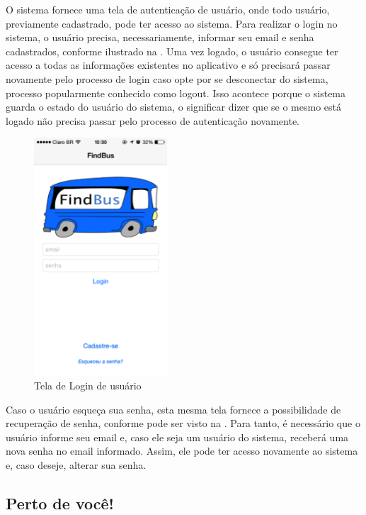 O sistema fornece uma tela de autenticação de usuário, onde todo usuário, previamente cadastrado, pode ter acesso ao sistema. Para realizar o login no sistema, o usuário precisa, necessariamente, informar seu email e senha cadastrados, conforme ilustrado na . Uma vez logado, o usuário consegue ter acesso a todas as informações existentes no aplicativo e só precisará passar novamente pelo processo de login caso opte por se desconectar do sistema, processo popularmente conhecido como logout. Isso acontece porque o sistema guarda o estado do usuário do sistema, o significar dizer que se o mesmo está logado não precisa passar pelo processo de autenticação novamente.

\begin{figure}[htp]
\begin{center}
  \includegraphics[width=5cm]{images/telas/loginDeUsuario.png}
  \caption{Tela de Login de usuário}
  \label{fig:telaLogin}
\end{center}
\end{figure}

Caso o usuário esqueça sua senha, esta mesma tela fornece a possibilidade de recuperação de senha, conforme pode ser visto na . Para tanto, é necessário que o usuário informe seu email e, caso ele seja um usuário do sistema, receberá uma nova senha no email informado. Assim, ele pode ter acesso novamente ao sistema e, caso deseje, alterar sua senha. 

\subsection{Perto de você!}

